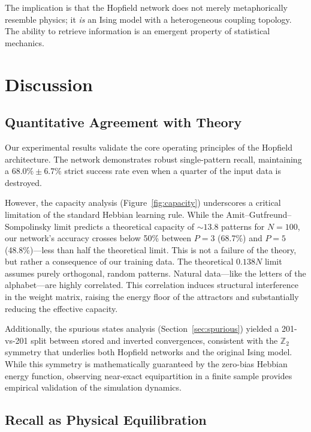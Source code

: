 \documentclass[11pt,a4paper,twocolumn]{article}
\newcommand{\Z}{\mathbb{Z}}
\begin{document}
The implication is that the Hopfield network does not merely
metaphorically resemble physics; it \emph{is} an Ising model with a
heterogeneous coupling topology. The ability to retrieve information is an
emergent property of statistical mechanics.

\section{Discussion}
\label{sec:discussion}

\subsection{Quantitative Agreement with Theory}
\label{sec:quant_agreement}

Our experimental results validate the core operating principles of the
Hopfield architecture. The network demonstrates robust single-pattern recall,
maintaining a $68.0\% \pm 6.7\%$ strict success rate even when a quarter of
the input data is destroyed.

However, the capacity analysis (Figure~\ref{fig:capacity}) underscores a
critical limitation of the standard Hebbian learning rule. While the
Amit--Gutfreund--Sompolinsky limit predicts a theoretical capacity of
$\sim 13.8$ patterns for $N=100$, our network's accuracy crosses below 50\%
between $P=3$ (68.7\%) and $P=5$ (48.8\%)---less than half the theoretical
limit. This is not a failure of the theory, but rather a consequence of our
training data. The theoretical $0.138N$ limit assumes purely orthogonal,
random patterns. Natural data---like the letters of the alphabet---are highly
correlated. This correlation induces structural interference in the weight
matrix, raising the energy floor of the attractors and substantially reducing
the effective capacity.

Additionally, the spurious states analysis (Section~\ref{sec:spurious})
yielded a 201-vs-201 split between stored and inverted convergences,
consistent with the $\Z_2$ symmetry that underlies both Hopfield networks and
the original Ising model. While this symmetry is mathematically guaranteed by
the zero-bias Hebbian energy function, observing near-exact equipartition in
a finite sample provides empirical validation of the simulation dynamics.

\subsection{Recall as Physical Equilibration}
\label{sec:recall_equilibration}
\end{document}

